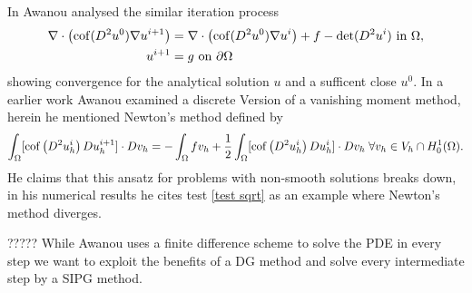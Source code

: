 In \cite{Awanou2014} Awanou analysed the similar iteration process
\begin{align}
	\nabla \cdot \left( \operatorname{cof}(D^2 u^0) \nabla u^{i+1} \right) &= \nabla \cdot \left( \operatorname{cof}(D^2 u^0) \nabla u^{i} \right) + f - \operatorname{det} (D^2u^i) \textnormal{ in } \Omega,  \label{eq: Awanout eq}\\
	u^{i+1} &= g \textnormal{ on } \partial \Omega 
\end{align}
showing convergence for the analytical solution $u$ and a sufficent close $u^0$. 
In a earlier work \cite{Awanou2010} Awanou examined a discrete Version of a vanishing moment method, herein he mentioned Newton's method defined by
\[
	\int_{\Omega} [\operatorname{cof} \left(  D^2 u_h^i \right) Du_h^{i+1}] \cdot Dv_h = -	\int_{\Omega} f v_h + \frac 1 2 \int_{\Omega} [\operatorname{cof} \left(  D^2 u_h^i \right) Du_h^{i}] \cdot Dv_h \; \forall v_h \in V_h \cap H^1_0 (\Omega)  \label{eq: Awanout eq2}.
\]
He claims that this ansatz for problems with non-smooth solutions breaks down, in his numerical results he cites test \ref{test sqrt} as an example where Newton's method diverges.

?????
While Awanou uses a finite difference scheme to solve the PDE in every step we want to exploit the benefits of a DG method and solve every intermediate step by a SIPG method. 
